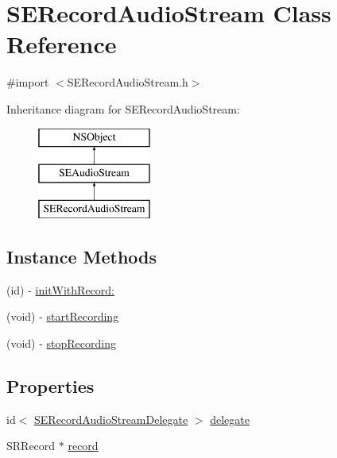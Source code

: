 \hypertarget{interface_s_e_record_audio_stream}{\section{S\-E\-Record\-Audio\-Stream Class Reference}
\label{interface_s_e_record_audio_stream}
}


{\ttfamily \#import $<$S\-E\-Record\-Audio\-Stream.\-h$>$}

Inheritance diagram for S\-E\-Record\-Audio\-Stream\-:\begin{figure}[H]
\begin{center}
\leavevmode
\includegraphics[height=3.000000cm]{interface_s_e_record_audio_stream}
\end{center}
\end{figure}
\subsection*{Instance Methods}
\begin{DoxyCompactItemize}
\item 
(id) -\/ \hyperlink{interface_s_e_record_audio_stream_a92c7ab157006ec7f599b742512173417}{init\-With\-Record\-:}
\item 
(void) -\/ \hyperlink{interface_s_e_record_audio_stream_afa78c4835ce4e83bfca38800faed0f33}{start\-Recording}
\item 
(void) -\/ \hyperlink{interface_s_e_record_audio_stream_a10e91ee60958add80d70acbf6741b2db}{stop\-Recording}
\end{DoxyCompactItemize}
\subsection*{Properties}
\begin{DoxyCompactItemize}
\item 
id$<$ \hyperlink{protocol_s_e_record_audio_stream_delegate-p}{S\-E\-Record\-Audio\-Stream\-Delegate} $>$ \hyperlink{interface_s_e_record_audio_stream_a63ed0771101a0265b303e0ae90a4258a}{delegate}
\item 
S\-R\-Record $\ast$ \hyperlink{interface_s_e_record_audio_stream_a7f9b00906c871fef706dd86b29044185}{record}
\end{DoxyCompactItemize}



